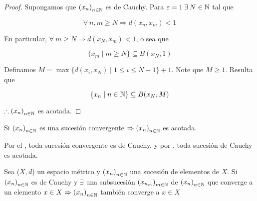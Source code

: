 \begin{proof}
    Supongamos que ${\left( x_n\right)}_{n \in \mathbb{N}}$ es de Cauchy. Para $\varepsilon = 1 \: \exists \: N \in \mathbb{N}$ tal que 

    $$\forall \: n,m \geqslant N \Rightarrow d(x_n, x_m) < 1$$

    En particular, $\forall \: m \geqslant N \Rightarrow  d(x_N, x_m) < 1$, o sea que 

    $$\{ x_m \mid m \geqslant N \} \subseteq B(x_N, 1)$$

    Definamos $M = \max \{ d(x_i,x_N) \mid 1 \leqslant i \leqslant N -1 \} + 1$. Note que $M \geqslant 1$. Resulta que

    $$\{ x_n \mid n \in \mathbb{N} \} \subseteq B(x_N, M)$$

    $\therefore {\left( x_n\right)}_{n \in \mathbb{N}}$ es acotada.
\end{proof}

\begin{corollary}
    Si ${\left( x_n\right)}_{n \in \mathbb{N}}$ es una sucesión convergente $\Rightarrow {\left( x_n\right)}_{n \in \mathbb{N}}$ es acotada.
\end{corollary}

\begin{orangeproof}
    Por el , toda sucesión convergente es de Cauchy, y por , toda sucesión de Cauchy es acotada. 
\end{orangeproof}

\begin{theorem} \label{theom414}
    Sea ($X,d$) un espacio métrico y ${\left( x_n\right)}_{n \in \mathbb{N}}$ una sucesión de elementos de $X$. Si ${\left( x_n\right)}_{n \in \mathbb{N}}$ es de Cauchy y $\exists$ una subsucesión ${\left( x_{n_m}\right)}_{m \in \mathbb{N}}$ de ${\left( x_n\right)}_{n \in \mathbb{N}}$ que converge a un elemento $ x \in X \Rightarrow {\left( x_n\right)}_{n \in \mathbb{N}}$ también converge a $x \in X$
\end{theorem}

